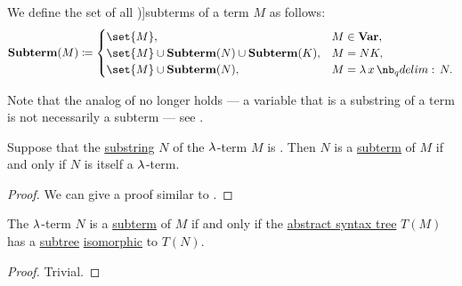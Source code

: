 \begin{definition}\label{def:lambda_subterm}
  We define the set of all \term[ru=подтерм (\cite[189]{Герасимов2011Вычислимость})]{subterms} of a term \( M \) as follows:
  \begin{equation*}
    \op*{Subterm}(M) \coloneqq \begin{cases}
      \set{ M },                                             &M \in \op*{Var}, \\
      \set{ M } \cup \op*{Subterm}(N) \cup \op*{Subterm}(K), &M = N K, \\
      \set{ M } \cup \op*{Subterm}(N),                       &M = \qabs x N.
    \end{cases}
  \end{equation*}
\end{definition}
\begin{comments}
  \item Note that the analog of  no longer holds --- a variable that is a substring of a term is not necessarily a subterm --- see .
\end{comments}

\begin{proposition}\label{thm:lambda_subterm_characterization}
  Suppose that the \hyperref[def:formal_language/substring]{substring} \( N \) of the \( \mathrm{\lambda} \)-term \( M \) is . Then \( N \) is a \hyperref[def:lambda_subterm]{subterm} of \( M \) if and only if \( N \) is itself a \( \mathrm{\lambda} \)-term.
\end{proposition}
\begin{proof}
  We can give a proof similar to .
\end{proof}

\begin{proposition}\label{thm:lambda_term_ast_subterm}
  The \( \mathrm{\lambda} \)-term \( N \) is a \hyperref[def:lambda_subterm]{subterm} of \( M \) if and only if the \hyperref[def:lambda_term_ast]{abstract syntax tree} \( T(M) \) has a \hyperref[def:tree/subtree]{subtree} \hyperref[def:labeled_tree/homomorphism]{isomorphic} to \( T(N) \).
\end{proposition}
\begin{proof}
  Trivial.
\end{proof}

